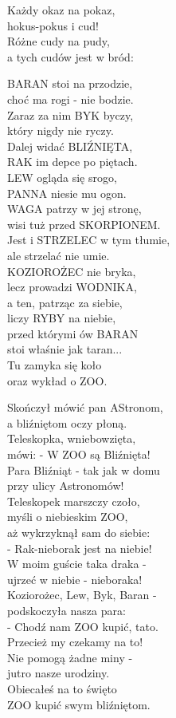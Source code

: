 \documentclass[11pt,a4pape,leqno,twoside]{book}
\begin{document}
Każdy okaz na pokaz,\\
hokus-pokus i cud!\\
Różne cudy na pudy,\\
a tych cudów jest w bród:\\ \vspace{0.1cm}

BARAN stoi na przodzie,\\
choć ma rogi - nie bodzie.\\
Zaraz za nim BYK byczy,\\
który nigdy nie ryczy.\\
Dalej widać BLIŹNIĘTA,\\
RAK im depce po piętach.\\
LEW ogląda się srogo,\\
PANNA niesie mu ogon.\\
WAGA patrzy w jej stronę,\\
wisi tuż przed SKORPIONEM.\\
Jest i STRZELEC w tym tłumie,\\
ale strzelać nie umie.\\
KOZIOROŻEC nie bryka,\\
lecz prowadzi WODNIKA,\\
a ten, patrząc za siebie,\\
liczy RYBY na niebie,\\
przed którymi ów BARAN\\
stoi właśnie jak taran...\\
Tu zamyka się koło\\
oraz wykład o ZOO.\\ \vspace{0.1cm}

Skończył mówić pan AStronom,\\
a bliźniętom oczy płoną.\\
Teleskopka, wniebowzięta,\\
mówi: - W ZOO są Bliźnięta!\\
Para Bliźniąt - tak jak w domu\\
przy ulicy Astronomów!\\
Teleskopek marszczy czoło,\\
myśli o niebieskim ZOO,\\
aż wykrzyknął sam do siebie:\\
- Rak-nieborak jest na niebie!\\
W moim guście taka draka -\\
ujrzeć w niebie - nieboraka!\\
Koziorożec, Lew, Byk, Baran -\\
podskoczyła nasza para:\\
- Chodź nam ZOO kupić, tato.\\
Przecież my czekamy na to!\\
Nie pomogą żadne miny -\\
jutro nasze urodziny.\\
Obiecałeś na to święto\\
ZOO kupić swym bliźniętom.\\ \vspace{0.1cm}
\end{document}
